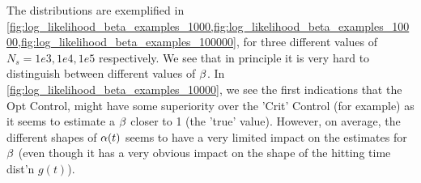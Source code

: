 The distributions are exemplified in
\cref{fig:log_likelihood_beta_examples_1000,fig:log_likelihood_beta_examples_10000,fig:log_likelihood_beta_examples_100000},
for three different values of $N_s = 1e3, 1e4, 1e5$ respectively. We see that in
principle it is very hard to distinguish between different values of $\beta$. In
\cref{fig:log_likelihood_beta_examples_10000}, we see the first indications that
the Opt Control, might have some superiority over the 'Crit' Control (for
example) as it seems to estimate a $\beta$ closer to 1 (the 'true' value). However,
on average, the different shapes of $\alpha(t)$ seems to have a very limited impact
on the estimates for $\beta$ (even though it has a very obvious impact on the shape
of the hitting time dist'n $g(t)$).


\begin{figure}[h]
\begin{center} 
\\   
\end{center}
\end{figure}
